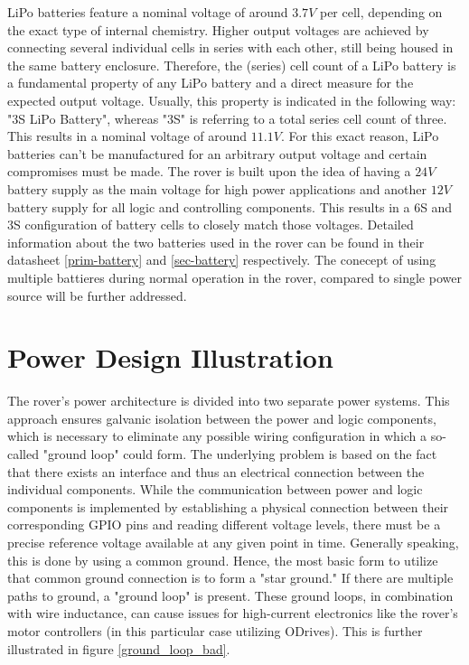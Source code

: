     \vspace{5mm} %
    
    LiPo batteries feature a nominal voltage of around $3.7V$ per cell, depending on the exact type of internal chemistry. Higher output voltages are achieved by connecting several individual cells in series with each other, still being housed in the same battery enclosure. Therefore, the (series) cell count of a LiPo battery is a fundamental property of any LiPo battery and a direct measure for the expected output voltage. Usually, this property is indicated in the following way: "3S LiPo Battery", whereas "3S" is referring to a total series cell count of three. This results in a nominal voltage of around $11.1V$. For this exact reason, LiPo batteries can't be manufactured for an arbitrary output voltage and certain compromises must be made. The rover is built upon the idea of having a $24V$ battery supply as the main voltage for high power applications and another $12V$ battery supply for all logic and controlling components. This results in a 6S and 3S configuration of battery cells to closely match those voltages. Detailed information about the two batteries used in the rover can be found in their datasheet \ref{prim-battery} and \ref{sec-battery} respectively. The conecept of using multiple battieres during normal operation in the rover, compared to single power source will be further addressed.

    \clearpage %
    
\section{Power Design Illustration}

    The rover's power architecture is divided into two separate power systems. This approach ensures galvanic isolation between the power and logic components, which is necessary to eliminate any possible wiring configuration in which a so-called "ground loop" could form. The underlying problem is based on the fact that there exists an interface and thus an electrical connection between the individual components. While the communication between power and logic components is implemented by establishing a physical connection between their corresponding GPIO pins and reading different voltage levels, there must be a precise reference voltage available at any given point in time. Generally speaking, this is done by using a common ground. Hence, the most basic form to utilize that common ground connection is to form a "star ground." If there are multiple paths to ground, a "ground loop" is present. These ground loops, in combination with wire inductance, can cause issues for high-current electronics like the rover's motor controllers (in this particular case utilizing ODrives). This is further illustrated in figure \ref{ground_loop_bad}.
    

